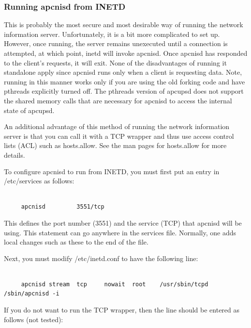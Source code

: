 {{{{{{{{{{\label{Running-apcnisd-from-INETD}

\subsubsection*{Running apcnisd from INETD}

This is probably the most secure and most desirable way of running the network
information server. Unfortunately, it is a bit more complicated to set up.
However, once running, the server remains unexecuted until a connection is
attempted, at which point, inetd will invoke apcnisd. Once apcnisd has
responded to the client's requests, it will exit. None of the disadvantages of
running it standalone apply since apcnisd runs only when a client is
requesting data. Note, running in this manner works only if you are using the
old forking code and have pthreads explicitly turned off. The pthreads version
of apcupsd does not support the shared memory calls that are necessary for
apcnisd to access the internal state of apcupsd.  

An additional advantage of this method of running the network information
server is that you can call it with a TCP wrapper and thus use access control
lists (ACL) such as hosts.allow. See the man pages for hosts.allow for more
details.  

To configure apcnisd to run from INETD, you must first put an entry in
/etc/services as follows: 

\footnotesize
\begin{verbatim}
     
     apcnisd         3551/tcp
\end{verbatim}
\normalsize

This defines the port number (3551) and the service (TCP) that apcnisd will be
using. This statement can go anywhere in the services file. Normally, one adds
local changes such as these to the end of the file.  

Next, you must modify /etc/inetd.conf to have the following line: 

\footnotesize
\begin{verbatim}
     
     apcnisd stream  tcp     nowait  root    /usr/sbin/tcpd  /sbin/apcnisd -i
\end{verbatim}
\normalsize

If you do not want to run the TCP wrapper, then the line should be entered as
follows (not tested): 

}}}}}}}}}}
